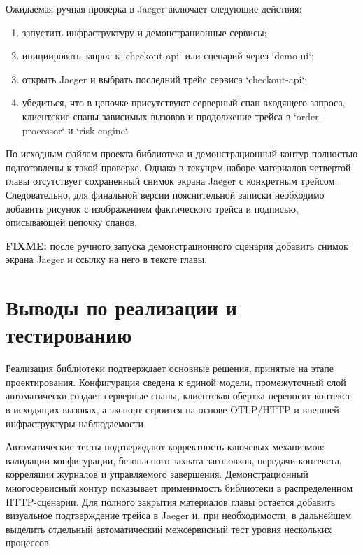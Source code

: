 Ожидаемая ручная проверка в Jaeger включает следующие действия:
\begin{enumerate}
    \item запустить инфраструктуру и демонстрационные сервисы;
    \item инициировать запрос к `checkout-api` или сценарий через `demo-ui`;
    \item открыть Jaeger и выбрать последний трейс сервиса `checkout-api`;
    \item убедиться, что в цепочке присутствуют серверный спан входящего
    запроса, клиентские спаны зависимых вызовов и продолжение трейса в
    `order-processor` и `risk-engine`.
\end{enumerate}

По исходным файлам проекта библиотека и демонстрационный контур полностью
подготовлены к такой проверке. Однако в текущем наборе материалов четвертой
главы отсутствует сохраненный снимок экрана Jaeger с конкретным трейсом.
Следовательно, для финальной версии пояснительной записки необходимо добавить
рисунок с изображением фактического трейса и подписью, описывающей цепочку
спанов.

\textbf{FIXME:} после ручного запуска демонстрационного сценария добавить
снимок экрана Jaeger и ссылку на него в тексте главы.

\section{Выводы по реализации и тестированию}

Реализация библиотеки подтверждает основные решения, принятые на этапе
проектирования. Конфигурация сведена к единой модели, промежуточный слой
автоматически создает серверные спаны, клиентская обертка переносит контекст в
исходящих вызовах, а экспорт строится на основе OTLP/HTTP и внешней
инфраструктуры наблюдаемости.

Автоматические тесты подтверждают корректность ключевых механизмов: валидации
конфигурации, безопасного захвата заголовков, передачи контекста, корреляции
журналов и управляемого завершения. Демонстрационный многосервисный контур
показывает применимость библиотеки в распределенном HTTP-сценарии. Для полного
закрытия материалов главы остается добавить визуальное подтверждение трейса в
Jaeger и, при необходимости, в дальнейшем выделить отдельный автоматический
межсервисный тест уровня нескольких процессов.
